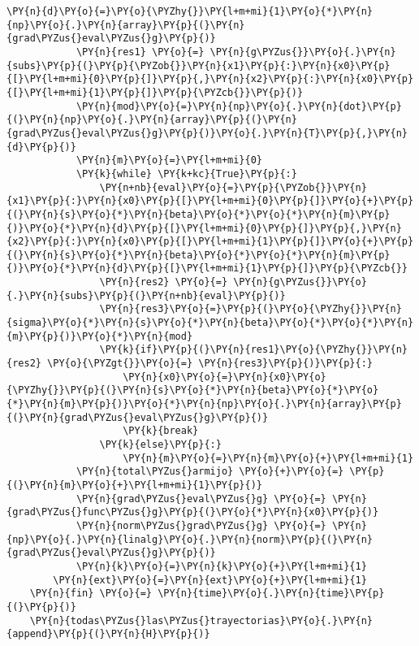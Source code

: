 \begin{itemize}
\begin{tcolorbox}[breakable, size=fbox, boxrule=1pt, pad at break*=1mm,colback=cellbackground, colframe=cellborder]
\begin{Verbatim}[commandchars=\\\{\}]
            \PY{n}{d}\PY{o}{=}\PY{o}{\PYZhy{}}\PY{l+m+mi}{1}\PY{o}{*}\PY{n}{np}\PY{o}{.}\PY{n}{array}\PY{p}{(}\PY{n}{grad\PYZus{}eval\PYZus{}g}\PY{p}{)}
            \PY{n}{res1} \PY{o}{=} \PY{n}{g\PYZus{}}\PY{o}{.}\PY{n}{subs}\PY{p}{(}\PY{p}{\PYZob{}}\PY{n}{x1}\PY{p}{:}\PY{n}{x0}\PY{p}{[}\PY{l+m+mi}{0}\PY{p}{]}\PY{p}{,}\PY{n}{x2}\PY{p}{:}\PY{n}{x0}\PY{p}{[}\PY{l+m+mi}{1}\PY{p}{]}\PY{p}{\PYZcb{}}\PY{p}{)}
            \PY{n}{mod}\PY{o}{=}\PY{n}{np}\PY{o}{.}\PY{n}{dot}\PY{p}{(}\PY{n}{np}\PY{o}{.}\PY{n}{array}\PY{p}{(}\PY{n}{grad\PYZus{}eval\PYZus{}g}\PY{p}{)}\PY{o}{.}\PY{n}{T}\PY{p}{,}\PY{n}{d}\PY{p}{)}
            \PY{n}{m}\PY{o}{=}\PY{l+m+mi}{0}
            \PY{k}{while} \PY{k+kc}{True}\PY{p}{:}
                \PY{n+nb}{eval}\PY{o}{=}\PY{p}{\PYZob{}}\PY{n}{x1}\PY{p}{:}\PY{n}{x0}\PY{p}{[}\PY{l+m+mi}{0}\PY{p}{]}\PY{o}{+}\PY{p}{(}\PY{n}{s}\PY{o}{*}\PY{n}{beta}\PY{o}{*}\PY{o}{*}\PY{n}{m}\PY{p}{)}\PY{o}{*}\PY{n}{d}\PY{p}{[}\PY{l+m+mi}{0}\PY{p}{]}\PY{p}{,}\PY{n}{x2}\PY{p}{:}\PY{n}{x0}\PY{p}{[}\PY{l+m+mi}{1}\PY{p}{]}\PY{o}{+}\PY{p}{(}\PY{n}{s}\PY{o}{*}\PY{n}{beta}\PY{o}{*}\PY{o}{*}\PY{n}{m}\PY{p}{)}\PY{o}{*}\PY{n}{d}\PY{p}{[}\PY{l+m+mi}{1}\PY{p}{]}\PY{p}{\PYZcb{}}
                \PY{n}{res2} \PY{o}{=} \PY{n}{g\PYZus{}}\PY{o}{.}\PY{n}{subs}\PY{p}{(}\PY{n+nb}{eval}\PY{p}{)}    
                \PY{n}{res3}\PY{o}{=}\PY{p}{(}\PY{o}{\PYZhy{}}\PY{n}{sigma}\PY{o}{*}\PY{n}{s}\PY{o}{*}\PY{n}{beta}\PY{o}{*}\PY{o}{*}\PY{n}{m}\PY{p}{)}\PY{o}{*}\PY{n}{mod}
                \PY{k}{if}\PY{p}{(}\PY{n}{res1}\PY{o}{\PYZhy{}}\PY{n}{res2} \PY{o}{\PYZgt{}}\PY{o}{=} \PY{n}{res3}\PY{p}{)}\PY{p}{:}
                    \PY{n}{x0}\PY{o}{=}\PY{n}{x0}\PY{o}{\PYZhy{}}\PY{p}{(}\PY{n}{s}\PY{o}{*}\PY{n}{beta}\PY{o}{*}\PY{o}{*}\PY{n}{m}\PY{p}{)}\PY{o}{*}\PY{n}{np}\PY{o}{.}\PY{n}{array}\PY{p}{(}\PY{n}{grad\PYZus{}eval\PYZus{}g}\PY{p}{)}
                    \PY{k}{break}
                \PY{k}{else}\PY{p}{:}
                    \PY{n}{m}\PY{o}{=}\PY{n}{m}\PY{o}{+}\PY{l+m+mi}{1}
            \PY{n}{total\PYZus{}armijo} \PY{o}{+}\PY{o}{=} \PY{p}{(}\PY{n}{m}\PY{o}{+}\PY{l+m+mi}{1}\PY{p}{)}
            \PY{n}{grad\PYZus{}eval\PYZus{}g} \PY{o}{=} \PY{n}{grad\PYZus{}func\PYZus{}g}\PY{p}{(}\PY{o}{*}\PY{n}{x0}\PY{p}{)}   
            \PY{n}{norm\PYZus{}grad\PYZus{}g} \PY{o}{=} \PY{n}{np}\PY{o}{.}\PY{n}{linalg}\PY{o}{.}\PY{n}{norm}\PY{p}{(}\PY{n}{grad\PYZus{}eval\PYZus{}g}\PY{p}{)}
            \PY{n}{k}\PY{o}{=}\PY{n}{k}\PY{o}{+}\PY{l+m+mi}{1}
        \PY{n}{ext}\PY{o}{=}\PY{n}{ext}\PY{o}{+}\PY{l+m+mi}{1}
    \PY{n}{fin} \PY{o}{=} \PY{n}{time}\PY{o}{.}\PY{n}{time}\PY{p}{(}\PY{p}{)}
    \PY{n}{todas\PYZus{}las\PYZus{}trayectorias}\PY{o}{.}\PY{n}{append}\PY{p}{(}\PY{n}{H}\PY{p}{)}

\end{Verbatim}
\end{tcolorbox}
\end{itemize}
